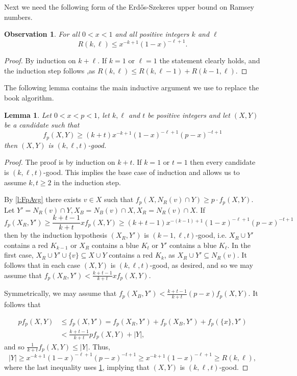 \documentclass[reqno,final,12pt]{amsart}
\newtheorem{lem}[thm]{Lemma}
\newtheorem{obs}[thm]{Observation}
\begin{document}
Next we need the following form of the Erd\H{o}s-Szekeres upper bound on Ramsey numbers.


\begin{obs}\label{o:easybound}For all $0<x<1$ and all positive integers $k$ and $\ell$
$$R(k,\ell) \leq x^{-k+1}(1-x)^{-\ell+1}.$$	
\end{obs}
\begin{proof}
	By induction on $k+\ell$. If $k=1$ or $\ell=1$ the statement clearly holds, and the induction step follows ,as
	$R(k,\ell) \leq R(k,\ell-1)+R(k-1,\ell).$
\end{proof}

The following lemma contains the main inductive argument we use to replace the book algorithm.

\begin{lem}\label{l:easy}
	Let $0<x<p<1$, let $k,\ell$ and $t$ be positive integers and let   $(X,Y)$ be a candidate such that 
	\begin{equation}\label{e:easy}
	f_{p}(X,Y) \geq  (k+t)x^{-k+1}(1-x)^{-\ell+1}(p-x)^{-t+1}
	\end{equation}	
	then $(X,Y)$ is $(k,\ell,t)$-good.
\end{lem}
\begin{proof}
	The proof is by induction on $k+t$. If $k=1$ or $t=1$ then  every candidate is $(k,\ell,t)$-good. This implies the base case of induction and allows us to assume $k,t \geq 2$ in the induction step. 
	
	By \cref{l:FpAvg} there exists $v \in X$ such that  $f_p(X,N_R(v) \cap Y) \geq p \cdot f_p(X,Y)$. Let $Y' = N_R(v) \cap Y, X_B=  N_B(v) \cap X, X_R=  N_R(v) \cap X$.
	If $$f_p(X_R,Y') \geq \frac{k+t-1}{k+t} x f_p(X,Y) \geq (k+t-1)x^{-(k-1)+1}(1-x)^{-\ell+1}(p-x)^{-t+1 }$$ then by the induction hypothesis $(X_R,Y')$ is  $(k-1,\ell,t)$-good, i.e. $X_R \cup Y'$ contains a red $K_{k-1}$ or $X_R$ contains a blue $K_t$ or $Y'$ contains a blue $K_\ell$. In the first case,  $X_R \cup Y' \cup \{v\} \subseteq X \cup Y$ contains a red $K_k$, as $X_R \cup Y' \subseteq N_R(v).$ It follows that in each case  $(X,Y)$ is  $(k,\ell,t)$-good, as desired, and so we may assume that $f_p(X_R,Y') < \frac{k+t-1}{k+t} x f_p(X,Y)$.
	
Symmetrically, we may assume that $f_p(X_B,Y') <\frac{k+t-1}{k+t}(p-x) f_p(X,Y)$.
It follows that

\begin{align*}
 	 p  f_p(X,Y) &\leq f_p(X,Y') = f_p(X_R,Y') + f_p(X_B,Y') + f_p(\{x\},Y') \\ &< \frac{k+t-1}{k+t}pf_p(X,Y) + |Y|,
	\end{align*}
and so $\frac{1}{{k+t}}f_p(X,Y) \leq |Y|$.
Thus, 
$$
|Y| \geq  x^{-k+1}(1-x)^{-\ell+1}(p-x)^{-t+1} \geq x^{-k+1}(1-x)^{-\ell+1} \geq  R(k,\ell),
$$	
where the last inequality uses \cref{o:easybound}, implying that $(X,Y)$ is  $(k,\ell,t)$-good. 
\end{proof}	
\end{document}
